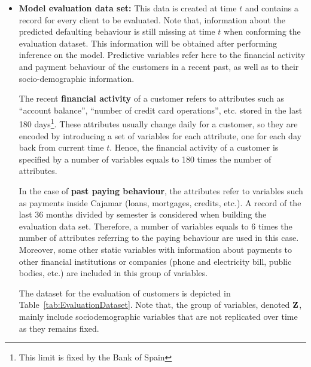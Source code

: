 \begin{itemize}
\item \textbf{Model evaluation data set:} This data is created at time $t$ and contains a record for every client to be evaluated. Note that, information about the predicted defaulting behaviour is still missing at time $t$ when conforming the evaluation dataset. This information will be obtained after performing inference on the model. 
Predictive variables refer here to the financial activity and payment behaviour of the customers in a recent past, as well as to their socio-demographic information. 

The recent {\bf financial activity} of a customer refers to attributes such as ``account balance'', ``number of credit card operations'', etc. stored in the last 180 days\footnote{This limit is fixed by the Bank of Spain}. These attributes usually change daily for a customer, so they are encoded by introducing a set of variables for each attribute, one for each day back from current time $t$. Hence, the financial activity of a customer is specified by a number of variables equals to 180 times the number of attributes. 

In the case of {\bf past paying behaviour}, the attributes refer to variables such as payments inside Cajamar (loans, mortgages, credits, etc.). A record of the last 36 months divided by semester is considered when building the evaluation data set. Therefore, a number of variables equals to $6$ times the number of attributes referring to the paying behaviour are used in this case. Moreover, some other static variables with information about payments to other financial institutions or companies (phone and electricity bill, public bodies, etc.) are included in this group of variables.

The dataset for the evaluation of customers is depicted in Table~\ref{tab:EvaluationDataset}. Note that, the group of variables, denoted $\mathbf{Z}$, mainly include sociodemographic variables that are not replicated over time as they remains fixed. 


\end{itemize}
